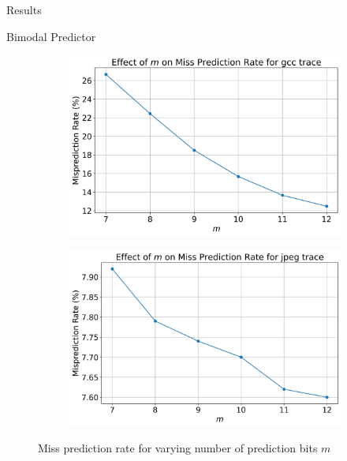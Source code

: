\begin{section}{Results}
\begin{subsection}{Bimodal Predictor}
   
        \begin{figure}[h] %
            \centering
            \begin{subfigure}[b]{0.45\textwidth}
                \centering
                \includegraphics[width=\textwidth]{figures/fig1/fig1a1.png} %
                \label{fig:pic1}
            \end{subfigure}
            \hfill
            \begin{subfigure}[b]{0.45\textwidth}
                \centering
                \includegraphics[width=\textwidth]{figures/fig1/fig1a2.png} %
                \label{fig:pic2}
            \end{subfigure}
            \caption{Miss prediction rate for varying number of prediction bits $m$}
            \label{fig:twopictures}
        \end{figure}


\end{subsection}
\end{section}

